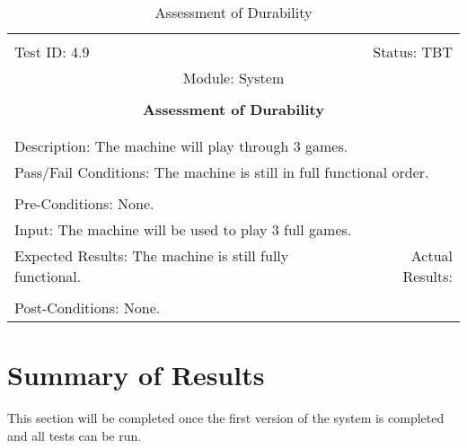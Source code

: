 \documentclass[titlepage]{article}
\begin{document}
\begin{center}%
\begin{table}[h!]
\begin{tabular}{|l r|}\hline&\\[-2mm]
	Test ID: 4.9	&Status: TBT\\[-3mm]
	\multicolumn{2}{|c|}{Module: System}\\&\\
	\multicolumn{2}{|c|}{\textbf{\large{Assessment of Durability}}}\\&\\\hline&\\[-3mm]
	\multicolumn{2}{|p{\textwidth}|}{Description: The machine will play through 3 games.}\\\hline
	\multicolumn{2}{|p{\textwidth}|}{Pass/Fail Conditions: The machine is still in full functional order.}\\[1mm]\hline&\\[-3mm]
	\multicolumn{2}{|p{\textwidth}|}{Pre-Conditions: None.}\\[4mm]
	\multicolumn{2}{|p{\textwidth}|}{Input: The machine will be used to play 3 full games.}\\[2mm]\hline
	\multicolumn{1}{|p{0.49\textwidth}}{Expected Results: The machine is still fully functional.}	&\multicolumn{1}{|p{0.45\textwidth}|}{Actual Results: }\\\hline&\\[-3mm]
	\multicolumn{2}{|p{\textwidth}|}{Post-Conditions: None.}\\\hline
\end{tabular}
\caption{Assessment of Durability}
\end{table}
\end{center}




\section{Summary of Results}
This section will be completed once the first version of the system is completed and all tests can be run.

\end{document}
